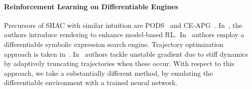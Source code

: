 \paragraph{Reinforcement Learning on Differentiable Engines}
Precursors of SHAC with similar intuition are PODS~\cite{Mora21} and CE-APG~\cite{Gillen22}. In~\cite{Lv23}, the authors introduce rendering to enhance model-based RL\@.\ In~\cite{Zheng24} authors employ a differentiable symbolic expression search engine. Trajectory optimization approach is taken in~\cite{Wan24}. In~\cite{Georgiev24} authors tackle unstable gradient due to stiff dynamics by adaptively truncating trajectories when these occur. With respect to this approach, we take a substantially different method, by emulating the differentiable environment with a trained neural network.
